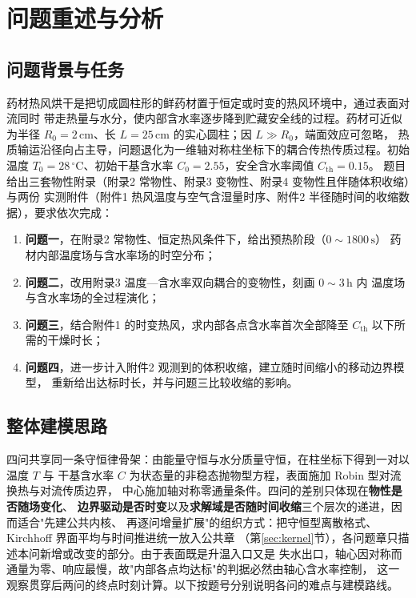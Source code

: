 \section{问题重述与分析}

\subsection{问题背景与任务}

药材热风烘干是把切成圆柱形的鲜药材置于恒定或时变的热风环境中，通过表面对流同时
带走热量与水分，使内部含水率逐步降到贮藏安全线的过程。药材可近似为半径
$R_0=2\,\mathrm{cm}$、长 $L=25\,\mathrm{cm}$ 的实心圆柱；因 $L\gg R_0$，端面效应可忽略，
热质输运沿径向占主导，问题退化为一维轴对称柱坐标下的耦合传热传质过程。初始温度
$T_0=28\,^{\circ}\mathrm{C}$、初始干基含水率 $C_0=2.55$，安全含水率阈值 $C_{\mathrm{th}}=0.15$。
题目给出三套物性附录（附录2 常物性、附录3 变物性、附录4 变物性且伴随体积收缩）与两份
实测附件（附件1 热风温度与空气含湿量时序、附件2 半径随时间的收缩数据），要求依次完成：

\begin{enumerate}
\item \textbf{问题一}，在附录2 常物性、恒定热风条件下，给出预热阶段（$0\sim1800\,\mathrm{s}$）
      药材内部温度场与含水率场的时空分布；
\item \textbf{问题二}，改用附录3 温度—含水率双向耦合的变物性，刻画 $0\sim3\,\mathrm{h}$ 内
      温度场与含水率场的全过程演化；
\item \textbf{问题三}，结合附件1 的时变热风，求内部各点含水率首次全部降至 $C_{\mathrm{th}}$
      以下所需的干燥时长；
\item \textbf{问题四}，进一步计入附件2 观测到的体积收缩，建立随时间缩小的移动边界模型，
      重新给出达标时长，并与问题三比较收缩的影响。
\end{enumerate}

\subsection{整体建模思路}

四问共享同一条守恒律骨架：由能量守恒与水分质量守恒，在柱坐标下得到一对以温度 $T$ 与
干基含水率 $C$ 为状态量的非稳态抛物型方程，表面施加 Robin 型对流换热与对流传质边界，
中心施加轴对称零通量条件。四问的差别只体现在\textbf{物性是否随场变化}、
\textbf{边界驱动是否时变}以及\textbf{求解域是否随时间收缩}三个层次的递进，因而适合"先建公共内核、
再逐问增量扩展"的组织方式：把守恒型离散格式、Kirchhoff 界面平均与时间推进统一放入公共章
（第\ref{sec:kernel}节），各问题章只描述本问新增或改变的部分。由于表面既是升温入口又是
失水出口，轴心因对称而通量为零、响应最慢，故"内部各点均达标"的判据必然由轴心含水率控制，
这一观察贯穿后两问的终点时刻计算。以下按题号分别说明各问的难点与建模路线。

